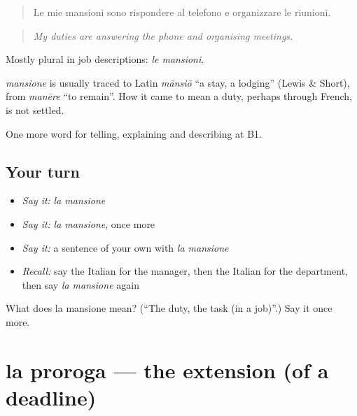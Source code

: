 \begin{quote}
Le mie mansioni sono rispondere al telefono e organizzare le riunioni.
\end{quote}

\begin{quote}
\emph{My duties are answering the phone and organising meetings.}
\end{quote}

Mostly plural in job descriptions: \emph{le mansioni}.

\begin{cousinweb}
\emph{mansione} is usually traced to Latin \emph{mānsiō} \textquotedblleft{}a stay, a lodging\textquotedblright{} (Lewis \& Short), from \emph{manēre} \textquotedblleft{}to remain\textquotedblright{}. How it came to mean a duty, perhaps through French, is not settled.
\end{cousinweb}

\begin{grammarlens}[title={What you've built}]
One more word for telling, explaining and describing at B1.
\end{grammarlens}

\subsection*{Your turn}
\begin{itemize}
\raggedright
  \item \emph{Say it:} \emph{la mansione}
  \item \emph{Say it:} \emph{la mansione}, once more
  \item \emph{Say it:} a sentence of your own with \emph{la mansione}
  \item \emph{Recall:} say the Italian for the manager, then the Italian for the department, then say \emph{la mansione} again
\end{itemize}

\begin{tcolorbox}[breakable,colback=teal!4,colframe=teal!35!black,title={Before you move on}]
What does la mansione mean? (\textquotedblleft{}The duty, the task (in a job)\textquotedblright{}.) Say it once more.
\end{tcolorbox}
\section[la proroga]{la proroga — the extension (of a deadline)}

\label{lesson:IT-C360-proroga}



